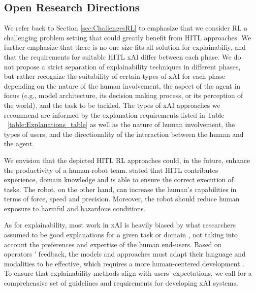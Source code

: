 \documentclass[twoside,11pt]{article}
\begin{document}
\begin{enumerate}
\subsection{Open Research Directions}

We refer back to Section \ref{sec:ChallengesRL} to emphasize that we consider RL a challenging problem setting that could greatly benefit from HITL approaches. We further emphasize that there is no one-size-fits-all solution for explainabiliy, and that the requirements for suitable HITL xAI differ between each phase. We do not propose a strict separation of explainability techniques in different phases, but rather recognize the suitability of certain types of xAI for each phase depending on the nature of the human involvement, the aspect of the agent in focus (e.g., model architecture, its decision making process, or its perception of the world), and the task to be tackled. The types of xAI approaches we recommend are informed by the explanation requirements listed in Table ~\ref{table:Explanations_table} as well as the nature of human involvement, the types of users, and the directionality of the interaction between the human and the agent.

We envision that the depicted HITL RL approaches could, in the future, enhance the productivity of a human-robot team. \citet{KhatibEtAl:1999:RihEnvironment} stated that HITL contributes experience, domain knowledge and is able to ensure the correct execution of tasks. The robot, on the other hand, can increase the human's capabilities in terms of force, speed and precision. Moreover, the robot should reduce human exposure to harmful and hazardous conditions. 

As for explainability, most work in xAI is heavily biased by what researchers assumed to be good explanations for a given task or domain \citep{Miller:2019:xAISocialSciencesInsights}, not taking into account the preferences and expertise of the human end-users. Based on operators ' feedback, the models and approaches must adapt their language and modalities to be effective, which requires a more human-centered development \citep{PuiuttaVeith:2020:xAIRLSurvey}. To ensure that explainability methods align with users' expectations, we call for a comprehensive set of guidelines and requirements for developing xAI systems. 


\end{enumerate}
\end{document}
